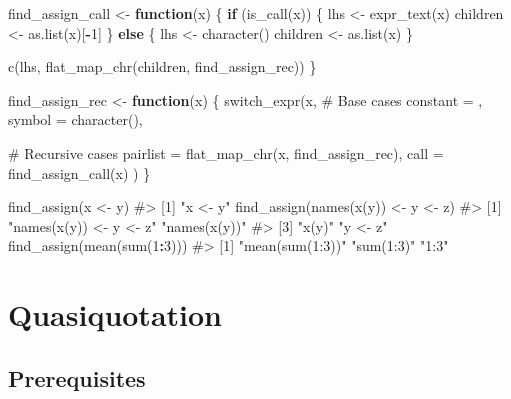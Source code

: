 \documentclass[
]{krantz}
\makeatletter
\newenvironment{Shaded}{\begin{snugshade}}{\end{snugshade}}
\newcommand{\CommentTok}[1]{\textcolor[rgb]{0.56,0.35,0.01}{\textit{#1}}}
\newcommand{\ControlFlowTok}[1]{\textcolor[rgb]{0.13,0.29,0.53}{\textbf{#1}}}
\newcommand{\DataTypeTok}[1]{\textcolor[rgb]{0.13,0.29,0.53}{#1}}
\newcommand{\DecValTok}[1]{\textcolor[rgb]{0.00,0.00,0.81}{#1}}
\newcommand{\KeywordTok}[1]{\textcolor[rgb]{0.13,0.29,0.53}{\textbf{#1}}}
\newcommand{\NormalTok}[1]{#1}
\newcommand{\OperatorTok}[1]{\textcolor[rgb]{0.81,0.36,0.00}{\textbf{#1}}}
\newcommand{\StringTok}[1]{\textcolor[rgb]{0.31,0.60,0.02}{#1}}
\newenvironment{kframe}{%
\medskip{}
\setlength{\fboxsep}{.8em}
 \def\at@end@of@kframe{}%
 \ifinner\ifhmode%
  \def\at@end@of@kframe{\end{minipage}}%
  \begin{minipage}{\columnwidth}%
 \fi\fi%
 \def\FrameCommand##1{\hskip\@totalleftmargin \hskip-\fboxsep
 \colorbox{shadecolor}{##1}\hskip-\fboxsep
     \hskip-\linewidth \hskip-\@totalleftmargin \hskip\columnwidth}%
 \MakeFramed {\advance\hsize-\width
   \@totalleftmargin\z@ \linewidth\hsize
   \@setminipage}}%
 {\par\unskip\endMakeFramed%
 \at@end@of@kframe}
\renewenvironment{Shaded}{\begin{kframe}}{\end{kframe}}
\renewcommand{\KeywordTok} [1]{\textcolor[rgb]{0.00,0.44,0.13}{{#1}}}
\renewcommand{\DataTypeTok}[1]{\textcolor[rgb]{0.56,0.13,0.00}{{#1}}}
\renewcommand{\DecValTok}  [1]{\textcolor[rgb]{0.25,0.63,0.44}{{#1}}}
\renewcommand{\StringTok}  [1]{\textcolor[rgb]{0.25,0.44,0.63}{{#1}}}
\renewcommand{\CommentTok} [1]{\textcolor[rgb]{0.38,0.63,0.69}{{#1}}}
\renewcommand{\NormalTok}  [1]{{#1}}
\makeatother
\begin{document}
\begin{Shaded}
\begin{Highlighting}[]
\NormalTok{find_assign_call <-}\StringTok{ }\ControlFlowTok{function}\NormalTok{(x) \{}
  \ControlFlowTok{if}\NormalTok{ (}\KeywordTok{is_call}\NormalTok{(x)) \{}
\NormalTok{    lhs <-}\StringTok{ }\KeywordTok{expr_text}\NormalTok{(x)}
\NormalTok{    children <-}\StringTok{ }\KeywordTok{as.list}\NormalTok{(x)[}\OperatorTok{-}\DecValTok{1}\NormalTok{]}
\NormalTok{  \} }\ControlFlowTok{else}\NormalTok{ \{}
\NormalTok{    lhs <-}\StringTok{ }\KeywordTok{character}\NormalTok{()}
\NormalTok{    children <-}\StringTok{ }\KeywordTok{as.list}\NormalTok{(x)}
\NormalTok{  \}}
  
  \KeywordTok{c}\NormalTok{(lhs, }\KeywordTok{flat_map_chr}\NormalTok{(children, find_assign_rec))}
\NormalTok{\}}

\NormalTok{find_assign_rec <-}\StringTok{ }\ControlFlowTok{function}\NormalTok{(x) \{}
  \KeywordTok{switch_expr}\NormalTok{(x,}
              \CommentTok{# Base cases}
              \DataTypeTok{constant =}\NormalTok{ ,}
              \DataTypeTok{symbol =} \KeywordTok{character}\NormalTok{(),}
              
              \CommentTok{# Recursive cases}
              \DataTypeTok{pairlist =} \KeywordTok{flat_map_chr}\NormalTok{(x, find_assign_rec),}
              \DataTypeTok{call =} \KeywordTok{find_assign_call}\NormalTok{(x)}
\NormalTok{  )}
\NormalTok{\}}

\KeywordTok{find_assign}\NormalTok{(x <-}\StringTok{ }\NormalTok{y)}
\CommentTok{#> [1] "x <- y"}
\KeywordTok{find_assign}\NormalTok{(}\KeywordTok{names}\NormalTok{(}\KeywordTok{x}\NormalTok{(y)) <-}\StringTok{ }\NormalTok{y <-}\StringTok{ }\NormalTok{z)}
\CommentTok{#> [1] "names(x(y)) <- y <- z" "names(x(y))"          }
\CommentTok{#> [3] "x(y)"                  "y <- z"}
\KeywordTok{find_assign}\NormalTok{(}\KeywordTok{mean}\NormalTok{(}\KeywordTok{sum}\NormalTok{(}\DecValTok{1}\OperatorTok{:}\DecValTok{3}\NormalTok{)))}
\CommentTok{#> [1] "mean(sum(1:3))" "sum(1:3)"       "1:3"}
\end{Highlighting}
\end{Shaded}

\hypertarget{quasiquotation}{%
\chapter{Quasiquotation}\label{quasiquotation}}

\hypertarget{prerequisites-10}{%
\section*{Prerequisites}\label{prerequisites-10}}
\end{document}
